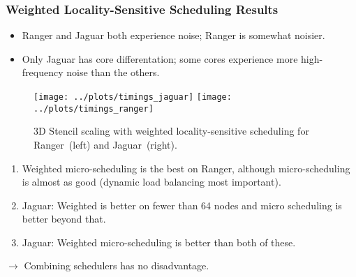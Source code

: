 \begin{frame}
\frametitle{Weighted Locality-Sensitive Scheduling Results}
\begin{itemize}
\tiny \item \tiny Ranger and Jaguar both experience noise; Ranger is
somewhat noisier.
\item \tiny Only Jaguar has core differentation; some cores experience 
more high-frequency noise than the others.
\end{itemize}

\begin{figure}
\label{fig:uWSched-stencil}
\begin{center}
\texttt{[image: ../plots/timings\_jaguar]}
\texttt{[image: ../plots/timings\_ranger]}\\
\end{center}
\caption{\label{fig:uWSched-stencil} 3D Stencil scaling with weighted
  locality-sensitive scheduling for Ranger~(left) and Jaguar~(right).}
\end{figure}

\begin{enumerate}
\tiny \item \tiny Weighted micro-scheduling is the best on Ranger,
although micro-scheduling is almost as good (dynamic load balancing
most important). 
\item \tiny Jaguar: Weighted is better on fewer than 64 nodes and
  micro scheduling is better beyond that. 
\item \tiny Jaguar: Weighted micro-scheduling is better than both of these. 
\end{enumerate}
{\tiny $\rightarrow$ Combining schedulers has no disadvantage.}
\end{frame}

